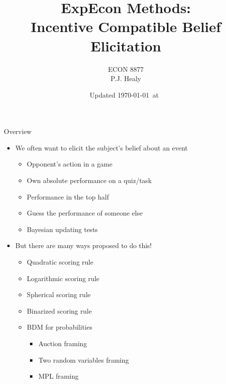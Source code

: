 

\newcommand{\topchat}[3]{\hline\textbf{ID\##2} & \textbf{#1} & \textbf{ID\##3}\\\hline}
\newcommand{\leftchat}[1]{\multicolumn{3}{|l|}{\cellcolor{blue!10}{\color{lefttext}#1}}\\}
\newcommand{\rightchat}[1]{\multicolumn{3}{|r|}{\cellcolor{red!10}{\color{blue!80}#1}}\\}
\newcommand{\answers}[2]{\hline\multicolumn{1}{|c|}{\textbf{#1}} &  & \multicolumn{1}{|c|}{\textbf{#2}}\\\hline}

\title[Incentives in Experiments: Theory]{ExpEcon Methods:\\Incentive Compatible Belief Elicitation}
\author[ECON 8877]{ECON 8877\\P.J. Healy} \color{metrop}
\institute[OSU]{}
\date[]{\vfill {\tiny Updated \today\ at\ \DTMcurrenttime}}



\frame{\maketitle}

\begin{frame}{Overview}
\begin{itemize}
    \item We often want to elicit the subject's belief about an event
    \begin{itemize}
        \item Opponent's action in a game
        \item Own absolute performance on a quiz/task
        \item Performance in the top half
        \item Guess the performance of someone else
        \item Bayesian updating tests
    \end{itemize}
    \item But there are many ways proposed to do this!
    \begin{itemize}
        \item Quadratic scoring rule
        \item Logarithmic scoring rule
        \item Spherical scoring rule
        \item Binarized scoring rule
        \item BDM for probabilities
        \begin{itemize}
            \item Auction framing
            \item Two random variables framing
            \item MPL framing
        \end{itemize}
    \end{itemize}
\end{itemize}
\end{frame}


